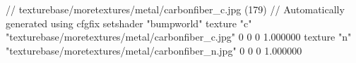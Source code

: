 // texturebase/moretextures/metal/carbonfiber_c.jpg (179)
// Automatically generated using cfgfix
setshader "bumpworld"
texture "c" "texturebase/moretextures/metal/carbonfiber_c.jpg" 0 0 0 1.000000
texture "n" "texturebase/moretextures/metal/carbonfiber_n.jpg" 0 0 0 1.000000
